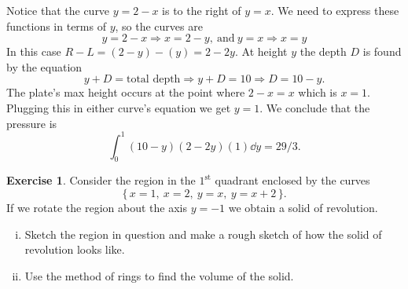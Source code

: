 \documentclass[12pt]{article}
\theoremstyle{plain}
\theoremstyle{definition}
\newtheorem{Ej}[Th]{Exercise}         %
\theoremstyle{remark}
\renewcommand{\:}{\colon}           %
\renewcommand{\.}{\Cdot}                %
\newcommand{\To}{\Rightarrow}
\newcommand{\set}[1]{\{\,#1\,\}}    %
\begin{document}
\begin{ptcb}
\begin{center}
  
  \end{center}
Notice that the curve $y=2-x$ is to the right of $y=x$. We need to express these functions in terms of $y$, so the curves are
$$y=2-x\To x=2-y,\ \text{and}\ y=x\To x=y$$
In this case $R-L=(2-y)-(y)=2-2y$. At height $y$ the depth $D$ is found by the equation
$$y+D=\text{total depth}\To y+D=10\To D=10-y.$$
The plate's max height occurs at the point where $2-x=x$ which is $x=1$. Plugging this in either curve's equation we get $y=1$. We conclude that the pressure is 
$$\int_0^1(10-y)(2-2y)(1)\dd y=29/3.$$
\end{ptcb}

\begin{Ej}
  Consider the region in the $1^{\text{st}}$ quadrant enclosed by the curves
  $$\set{x=1,\ x=2,\ y=x,\ y=x+2}.$$
  If we rotate the region about the axis $y=-1$ we obtain a solid of revolution.
  \begin{enumerate}[i)]
    \itemsep=-0.4em
    \item Sketch the region in question and make a rough sketch of how the solid of revolution looks like.
    \item Use the method of rings to find the volume of the solid.
  \end{enumerate}
\end{Ej}
\end{document}
